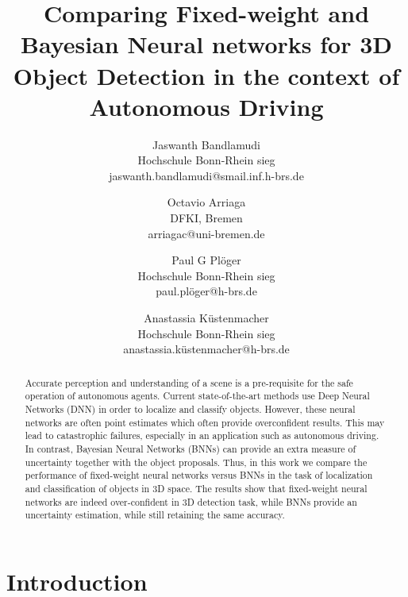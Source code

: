 \documentclass[10pt,twocolumn,letterpaper]{article}
\begin{document}
\title{Comparing Fixed-weight and Bayesian Neural networks for 3D Object Detection in the context of Autonomous Driving}

\author{Jaswanth Bandlamudi\\
Hochschule Bonn-Rhein sieg\\
jaswanth.bandlamudi@smail.inf.h-brs.de\\
\and 
Octavio Arriaga\\
DFKI, Bremen\\
arriagac@uni-bremen.de\\
\and
Paul G Pl\"{o}ger\\
Hochschule Bonn-Rhein sieg\\
paul.pl\"{o}ger@h-brs.de\\
\and
Anastassia K\"{u}stenmacher\\
Hochschule Bonn-Rhein sieg\\
anastassia.k\"{u}stenmacher@h-brs.de\\
}

\maketitle

\begin{abstract}
    Accurate perception and understanding of a scene is a pre-requisite for the safe operation of autonomous agents. Current state-of-the-art methods use Deep Neural Networks (DNN) in order to localize and classify objects. However, these neural networks are often point estimates which often provide overconfident results. This may lead to catastrophic failures, especially in an application such as autonomous driving. In contrast, Bayesian Neural Networks (BNNs) can provide an extra measure of uncertainty together with the object proposals. Thus, in this work we compare the performance of fixed-weight neural networks versus BNNs in the task of localization and classification of objects in 3D space. The results show that fixed-weight neural networks are indeed over-confident in 3D detection task, while BNNs provide an uncertainty estimation, while still retaining the same accuracy.
\end{abstract}

\section{Introduction}
\end{document}
